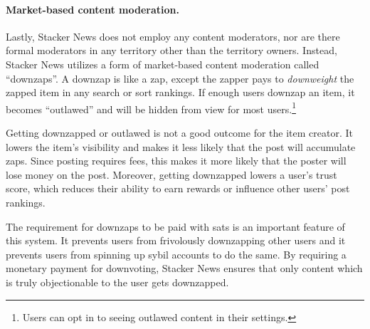 \paragraph{Market-based content moderation.} Lastly, Stacker News does not employ any content moderators, nor are there formal moderators in any territory other than the territory owners. Instead, Stacker News utilizes a form of market-based content moderation called ``downzaps''. A downzap is like a zap, except the zapper pays to \emph{downweight} the zapped item in any search or sort rankings. If enough users downzap an item, it becomes ``outlawed'' and will be hidden from view for most users.\footnote{Users can opt in to seeing outlawed content in their settings.}  

Getting downzapped or outlawed is not a good outcome for the item creator. It lowers the item's visibility and makes it less likely that the post will accumulate zaps. Since posting requires fees, this makes it more likely that the poster will lose money on the post. Moreover, getting downzapped lowers a user's trust score, which reduces their ability to earn rewards or influence other users' post rankings. 

The requirement for downzaps to be paid with sats is an important feature of this system. It prevents users from frivolously downzapping other users and it prevents users from spinning up sybil accounts to do the same. By requiring a monetary payment for downvoting, Stacker News ensures that only content which is truly objectionable to the user gets downzapped. 
